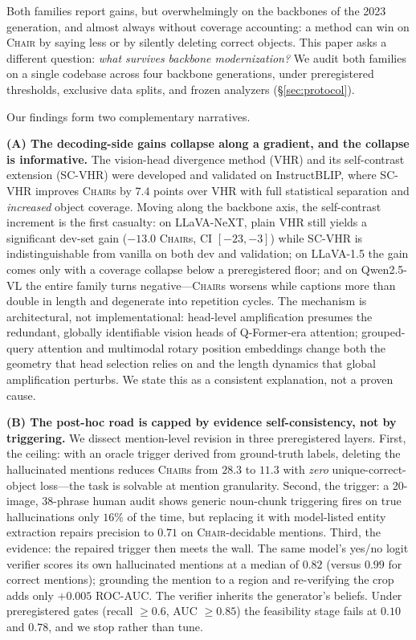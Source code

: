 \documentclass[11pt]{article}
\newcommand{\chair}{\textsc{Chair}}
\newcommand{\vhr}{VHR}
\newcommand{\scvhr}{SC-VHR}
\begin{document}
Both families report gains, but overwhelmingly on the backbones of the 2023 generation, and almost always without coverage accounting: a method can win on \chair{} by saying less or by silently deleting correct objects. This paper asks a different question: \emph{what survives backbone modernization?} We audit both families on a single codebase across four backbone generations, under preregistered thresholds, exclusive data splits, and frozen analyzers (\S\ref{sec:protocol}).

Our findings form two complementary narratives.

\textbf{(A) The decoding-side gains collapse along a gradient, and the collapse is informative.} The vision-head divergence method (\vhr{}) and its self-contrast extension (\scvhr{}) were developed and validated on InstructBLIP, where \scvhr{} improves \chair{s} by $7.4$ points over \vhr{} with full statistical separation and \emph{increased} object coverage. Moving along the backbone axis, the self-contrast increment is the first casualty: on LLaVA-NeXT, plain \vhr{} still yields a significant dev-set gain ($-13.0$ \chair{s}, CI $[-23,-3]$) while \scvhr{} is indistinguishable from vanilla on both dev and validation; on LLaVA-1.5 the gain comes only with a coverage collapse below a preregistered floor; and on Qwen2.5-VL the entire family turns negative---\chair{s} worsens while captions more than double in length and degenerate into repetition cycles. The mechanism is architectural, not implementational: head-level amplification presumes the redundant, globally identifiable vision heads of Q-Former-era attention; grouped-query attention and multimodal rotary position embeddings change both the geometry that head selection relies on and the length dynamics that global amplification perturbs. We state this as a consistent explanation, not a proven cause.

\textbf{(B) The post-hoc road is capped by evidence self-consistency, not by triggering.} We dissect mention-level revision in three preregistered layers. First, the ceiling: with an oracle trigger derived from ground-truth labels, deleting the hallucinated mentions reduces \chair{s} from $28.3$ to $11.3$ with \emph{zero} unique-correct-object loss---the task is solvable at mention granularity. Second, the trigger: a 20-image, 38-phrase human audit shows generic noun-chunk triggering fires on true hallucinations only $16\%$ of the time, but replacing it with model-listed entity extraction repairs precision to $0.71$ on \chair{}-decidable mentions. Third, the evidence: the repaired trigger then meets the wall. The same model's yes/no logit verifier scores its own hallucinated mentions at a median of $0.82$ (versus $0.99$ for correct mentions); grounding the mention to a region and re-verifying the crop adds only $+0.005$ ROC-AUC. The verifier inherits the generator's beliefs. Under preregistered gates (recall $\ge 0.6$, AUC $\ge 0.85$) the feasibility stage fails at $0.10$ and $0.78$, and we stop rather than tune.
\end{document}
